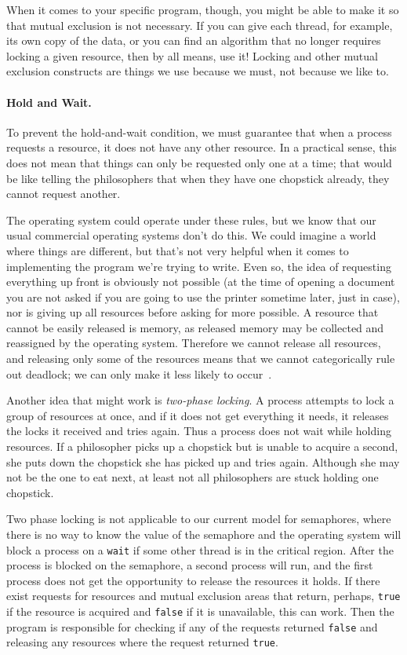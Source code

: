 When it comes to your specific program, though, you might be able to make it so that mutual exclusion is not necessary. If you can give each thread, for example, its own copy of the data,  or you can find an algorithm that no longer requires locking a given resource, then by all means, use it! Locking and other mutual exclusion constructs are things we use because we must, not because we like to.

\paragraph{Hold and Wait.} To prevent the hold-and-wait condition, we must guarantee that when a process requests a resource, it does not have any other resource. In a practical sense, this does not mean that things can only be requested only one at a time; that would be like telling the philosophers that when they have one chopstick already, they cannot request another.

The operating system could operate under these rules, but we know that our usual commercial operating systems don't do this. We could imagine a world where things are different, but that's not very helpful when it comes to implementing the program we're trying to write. Even so, the idea of requesting everything up front is obviously not possible (at the time of opening a document you are not asked if you are going to use the printer sometime later, just in case), nor is giving up all resources before asking for more possible. A resource that cannot be easily released is memory, as released memory may be collected and reassigned by the operating system. Therefore we cannot release all resources, and releasing only some of the resources means that we cannot categorically rule out deadlock; we can only make it less likely to occur~\cite{mte241}.

Another idea that might work is \textit{two-phase locking}. A process attempts to lock a group of resources at once, and if it does not get everything it needs, it releases the locks it received and tries again. Thus a process does not wait while holding resources. If a philosopher picks up a chopstick but is unable to acquire a second, she puts down the chopstick she has picked up and tries again. Although she may not be the one to eat next, at least not all philosophers are stuck holding one chopstick.

Two phase locking is not applicable to our current model for semaphores, where there is no way to know the value of the semaphore and the operating system will block a process on a \texttt{wait} if some other thread is in the critical region. After the process is blocked on the semaphore, a second process will run, and the first process does not get the opportunity to release the resources it holds. If there exist requests for resources and mutual exclusion areas that return, perhaps, \texttt{true} if the resource is acquired and \texttt{false} if it is unavailable, this can work. Then the program is responsible for checking if any of the requests returned \texttt{false} and releasing any resources where the request returned \texttt{true}.

